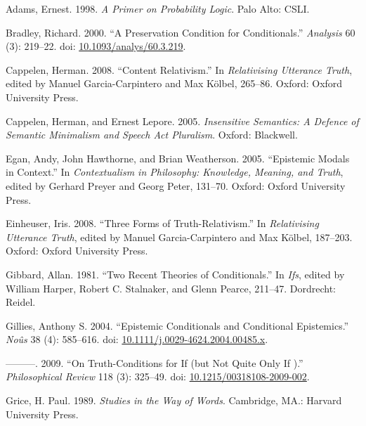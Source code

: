 \documentclass[
  11pt,
  letterpaper,
  DIV=11,
  numbers=noendperiod,
  twoside]{scrartcl}
\newlength{\cslhangindent}
\newenvironment{CSLReferences}[2] %
 {\begin{list}{}{%
  \setlength{\itemindent}{0pt}
  \setlength{\leftmargin}{0pt}
  \setlength{\parsep}{0pt}
  \ifodd #1
   \setlength{\leftmargin}{\cslhangindent}
   \setlength{\itemindent}{-1\cslhangindent}
  \fi
  \setlength{\itemsep}{#2\baselineskip}}}
 {\end{list}}
\begin{document}
\label{refs}
\begin{CSLReferences}{1}{0}
Adams, Ernest. 1998. \emph{A Primer on Probability Logic}. Palo Alto:
CSLI.

Bradley, Richard. 2000. {``A Preservation Condition for Conditionals.''}
\emph{Analysis} 60 (3): 219--22. doi:
\href{https://doi.org/10.1093/analys/60.3.219}{10.1093/analys/60.3.219}.

Cappelen, Herman. 2008. {``Content Relativism.''} In \emph{Relativising
Utterance Truth}, edited by Manuel Garcia-Carpintero and Max Kölbel,
265--86. Oxford: Oxford University Press.

Cappelen, Herman, and Ernest Lepore. 2005. \emph{Insensitive Semantics:
A Defence of Semantic Minimalism and Speech Act Pluralism}. Oxford:
Blackwell.

Egan, Andy, John Hawthorne, and Brian Weatherson. 2005. {``{Epistemic
Modals in Context}.''} In \emph{Contextualism in Philosophy: Knowledge,
Meaning, and Truth}, edited by Gerhard Preyer and Georg Peter, 131--70.
Oxford: Oxford University Press.

Einheuser, Iris. 2008. {``Three Forms of Truth-Relativism.''} In
\emph{Relativising Utterance Truth}, edited by Manuel Garcia-Carpintero
and Max Kölbel, 187--203. Oxford: Oxford University Press.

Gibbard, Allan. 1981. {``Two Recent Theories of Conditionals.''} In
\emph{Ifs}, edited by William Harper, Robert C. Stalnaker, and Glenn
Pearce, 211--47. Dordrecht: Reidel.

Gillies, Anthony S. 2004. {``Epistemic Conditionals and Conditional
Epistemics.''} \emph{No{û}s} 38 (4): 585--616. doi:
\href{https://doi.org/10.1111/j.0029-4624.2004.00485.x}{10.1111/j.0029-4624.2004.00485.x}.

---------. 2009. {``{On Truth-Conditions for If (but Not Quite Only If
)}.''} \emph{Philosophical Review} 118 (3): 325--49. doi:
\href{https://doi.org/10.1215/00318108-2009-002}{10.1215/00318108-2009-002}.

Grice, H. Paul. 1989. \emph{Studies in the Way of Words}. Cambridge,
MA.: Harvard University Press.


\end{CSLReferences}
\end{document}
